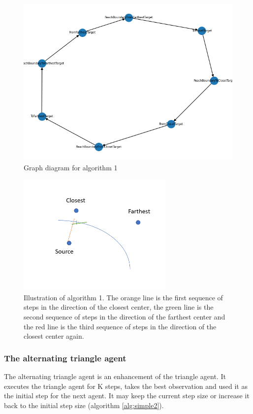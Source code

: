 \documentclass{article}
\begin{document}
\begin{figure}[h]
    \centering
        \includegraphics[scale=.8]{graph.png}
    \caption{Graph diagram for algorithm 1}
    \label{fig:graph}
\end{figure}

\begin{figure}[h]
    \centering
        \includegraphics[scale=1]{ilustration.png}
    \caption{Illustration of algorithm 1. The orange line is the first sequence of steps in the direction of the closest center, the green line is the second sequence of steps in the direction of the farthest center and the red line is the third sequence of steps in the direction of the closest center again.}
    \label{fig:illustration}
\end{figure}


\subsubsection{The alternating triangle agent}
The alternating triangle agent is an enhancement of the triangle agent. It executes the triangle agent for K steps, takes the best observation and used it as the initial step for the next agent. It may keep the current step size or increase it back to the initial step size (algorithm \ref{alg:simple2}).
\end{document}
